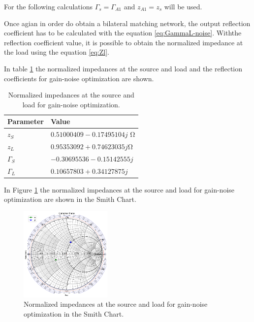 For the following calculations $\Gamma_s = \Gamma_{A1}$ and $z_{A1} = z_s$ will be used.

Once agian in order do obtain a bilateral matching network, the output reflection coefficient has to be calculated with the equation  \ref{eq:GammaL-noise}. Withthe reflection coefficient value, it is possible to obtain the normalized impedance at the load using the equation \ref{eq:Zl}.

In table \ref{gain-noise-impedances} the normalized impedances at the source and load and the reflection coefficients for gain-noise optimization are shown.

\begin{table}[H]
    \centering
    \caption{Normalized impedances at the source and load for gain-noise optimization.}
    \begin{tabularx}{\textwidth}{>{\centering\arraybackslash}X >{\centering\arraybackslash}X}
        \toprule
        \textbf{Parameter} & \textbf{Value} \\
        \midrule
        $z_{S}$     & $0.51000409-0.17495104j$ \si{\ohm} \\
        \midrule
        $z_{L}$     & $0.95353092+0.74623035j$\si{\ohm}\\
        \midrule
        $\Gamma_{S}$     & $-0.30695536-0.15142555j$\\
        \midrule
        $\Gamma_{L}$     & $0.10657803+0.34127875j$\\
        \bottomrule
    \end{tabularx}
    \label{gain-noise-impedances}
\end{table}

In Figure \ref{fig:ZsZl-gain-noise} the normalized impedances at the source and load for gain-noise optimization are shown in the Smith Chart.

\begin{figure}[H]
    \centering
    \includegraphics[width=0.4\textwidth]{Images/gain-noise-SC.png}
    \caption{Normalized impedances at the source and load for gain-noise optimization in the Smith Chart.}
    \label{fig:ZsZl-gain-noise}
\end{figure}

